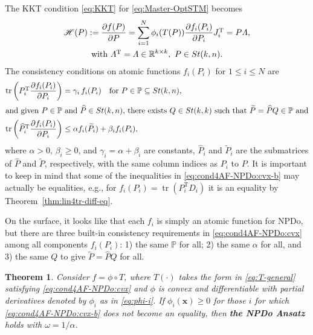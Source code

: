 \documentclass[11pt]{article}
\def\bx{\pmb{x}}
\def\bbP{\mathbb{P}}
\def\bbR{\mathbb{R}}
\def\scrH{\mathscr{H}}
\def\wtd{\widetilde}
\def\what{\widehat}
\newcommand\STM[2]{{\rm St}(#1,#2)}
\DeclareMathOperator{\tr}{tr}
\DeclareMathOperator{\T}{T}
\newtheorem{theorem}{Theorem}[section]
\theoremstyle{definition}
\numberwithin{equation}{section}
\begin{document}
The KKT condition \eqref{eq:KKT} for \eqref{eq:Master-OptSTM} becomes
\begin{subequations}\label{eq:KKT-comp}
\begin{gather}
\scrH(P):=\frac {\partial f(P)}{\partial P}
  =\sum_{i=1}^N\phi_i(T(P))\frac {\partial f_i(P_i)}{\partial P_i}J_i^{\T}
  =P\Lambda, \label{eq:KKT-comp-1}\\
\mbox{with} \,\, \Lambda^{\T}=\Lambda\in\bbR^{k\times k},\,\, P\in\STM{k}{n}. \label{eq:KKT-comp-2}
\end{gather}
\end{subequations}
The consistency conditions on atomic functions $f_i(P_i)$ for $1\le i\le N$ are
\begin{subequations}\label{eq:cond4AF-NPDo:cvx}
\begin{align}
\tr\left(P_i^{\T}\frac{\partial f_i(P_i)}{\partial P_i}\right)
     &=\gamma_i\, f_i(P_i)\quad\mbox{for $P\in\bbP\subseteq\STM{k}{n}$},
              \label{eq:cond4AF-NPDo:cvx-a} \\
\intertext{and given $P\in\bbP$ and $\what P\in\STM{k}{n}$, there exists $Q\in\STM{k}{k}$ such
that $\wtd P=\what PQ\in\bbP$ and} %
\tr\left(\what P_i^{\T}\frac{\partial f_i(P_i)}{\partial P_i}\right)
   &\le\alpha f_i(\wtd P_i)+\beta_i f_i(P_i), %
      \label{eq:cond4AF-NPDo:cvx-b}
\end{align}
\end{subequations}
where $\alpha>0,\,\beta_i\ge 0$,  and $\gamma_i=\alpha+\beta_i$ are  constants, $\what P_i$ and $\wtd P_i$ are the
submatrices of $\what P$ and $\wtd P$, respectively, with the same column indices as $P_i$ to $P$.
%
It is important to keep in mind that some of the inequalities in \eqref{eq:cond4AF-NPDo:cvx-b} may actually be equalities,
e.g.,  for $f_i(P_i)=\tr(P_i^{\T}D_i)$ it is an equality by Theorem~\ref{thm:lin4tr-diff-eq}.

On the surface, it looks like that each $f_i$ is simply an atomic function for NPDo, but there are three
built-in consistency requirements in \eqref{eq:cond4AF-NPDo:cvx} among
all components $f_i(P_i)$: 1) the same $\bbP$ for all;  2) the same $\alpha$ for all, and
3) the same $Q$ to give $\wtd P=\what PQ$ for all.

\begin{theorem}\label{thm:main-npd-cvx}
Consider $f=\phi\circ T$, where $T(\cdot)$ takes the form in \eqref{eq:T-general} satisfying
\eqref{eq:cond4AF-NPDo:cvx} and $\phi$ is convex and differentiable with partial derivatives denoted by
$\phi_i$ as in \eqref{eq:phi-i}.
If $\phi_i(\bx)\ge 0$ for those $i$ for which \eqref{eq:cond4AF-NPDo:cvx-b} does not become an equality, then {\bf the NPDo Ansatz} holds  with $\omega=1/\alpha$.
\end{theorem}
\end{document}
